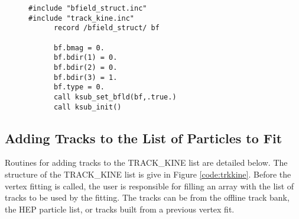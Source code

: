 \begin{figure}
\begin{tt}
\begin{verbatim}
#include "bfield_struct.inc"
#include "track_kine.inc"
      record /bfield_struct/ bf

      bf.bmag = 0.
      bf.bdir(1) = 0.
      bf.bdir(2) = 0.
      bf.bdir(3) = 1.
      bf.type = 0.           
      call ksub_set_bfld(bf,.true.)           
      call ksub_init()

\end{verbatim}
\end{tt}
\label{code:init2}
\end{figure}

\subsection{Adding Tracks to the List of Particles to Fit}
Routines for adding tracks to the {\small TRACK\_KINE} list are detailed 
below. The structure of the {\small TRACK\_KINE} list is give
in Figure \ref{code:trkkine}. Before
the vertex fitting is called, the user is responsible for filling an array with
the list of tracks to be used by the fitting.  The tracks can be from the
offline track bank, the {\small HEP} particle list, or tracks built 
from a previous vertex fit.
